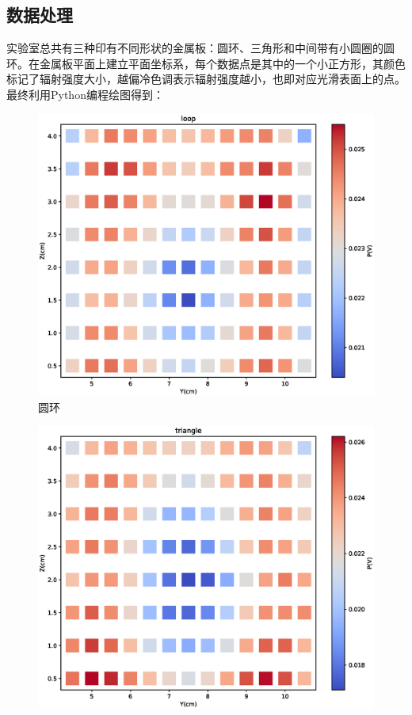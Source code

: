 \documentclass{WHUReport}
\begin{document}
\begin{multicols}{2}
	\subsection{数据处理}
	实验室总共有三种印有不同形状的金属板：圆环、三角形和中间带有小圆圈的圆环。在金属板平面上建立平面坐标系，每个数据点是其中的一个小正方形，其颜色标记了辐射强度大小，越偏冷色调表示辐射强度越小，也即对应光滑表面上的点。最终利用Python编程绘图得到：
	\begin{figure}[H]
		\centering
		\includegraphics[width=\linewidth]{figs/4loop.eps}
		\caption{圆环}
	\end{figure}
	\begin{figure}[H]
		\centering
		\includegraphics[width=\linewidth]{figs/4triangle.eps}

\end{figure}
\end{multicols}
\end{document}
